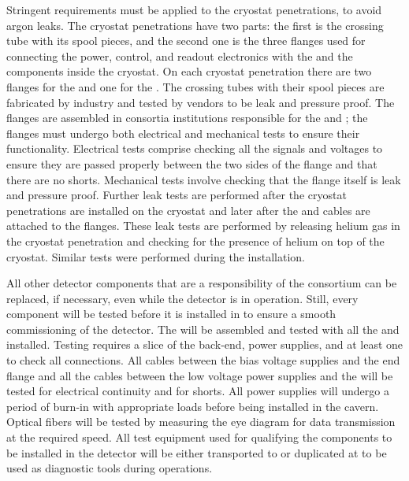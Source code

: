 Stringent requirements must be applied to the cryostat
penetrations, to avoid argon leaks. The cryostat penetrations 
have two parts: the first is the crossing tube with its spool pieces,
and the second one is the three flanges used for
connecting the power, control, and readout electronics with the
 and the  components inside the
cryostat. On each cryostat penetration there are two flanges for
the  and one for the . The crossing
tubes with their spool pieces are fabricated by industry and tested
by vendors to be leak and pressure proof. The flanges are assembled
in consortia institutions responsible for the  and ; the
flanges must undergo both electrical and mechanical tests to ensure their
functionality. Electrical tests comprise checking all the
signals and voltages to ensure they are passed properly between the two sides of the
flange and that there are no shorts. Mechanical tests involve 
checking that the flange itself is leak and pressure proof. Further
leak tests are performed after the cryostat penetrations are installed
on the cryostat and later after the  and 
cables are attached to the flanges. These leak tests are
performed by releasing helium gas in the cryostat penetration and
checking for the presence of helium on top of the cryostat. Similar
tests were performed during the  installation.

All other detector components that are a responsibility of
the  consortium can be replaced, if necessary,
even while the detector is in operation. Still, every component
will be tested before it is installed in  to ensure a
smooth commissioning of the detector. The  will be
assembled and tested with all the  and 
installed. Testing requires a slice of the  back-end,
power supplies, and at least one  to check all 
connections. All cables between the bias voltage supplies and
the end flange and all the cables between the low voltage power
supplies and the  will be tested for electrical
continuity and for shorts. All power supplies will undergo a
period of burn-in with appropriate loads before being installed
in the cavern. Optical fibers will be tested by measuring the
eye diagram for data transmission at the required speed. All
test equipment used for qualifying the components to be installed
in the detector will be either transported to  or duplicated
at  to be used as diagnostic tools during operations.

